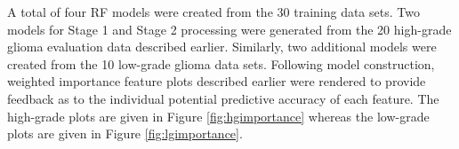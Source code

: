 \documentclass[preprint,authoryear,review,12pt]{elsarticle}
\begin{document}
A total of four RF models were created from the 30 training data 
sets. Two models for Stage 1 and Stage 2 processing were generated from the 
20 high-grade glioma evaluation data described earlier.  Similarly, two
additional models were created from the 10 low-grade glioma data sets.  Following
model construction, weighted importance feature plots described earlier were 
rendered to provide feedback as to the individual potential predictive accuracy
of each feature.  The high-grade plots are given in Figure \ref{fig:hgimportance}
whereas the low-grade plots are given in Figure \ref{fig:lgimportance}.

\begin{figure}
\end{figure}
\end{document}
